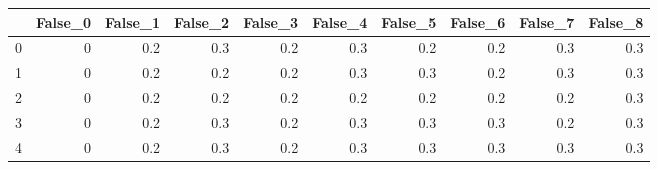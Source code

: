 \begin{tabular}{lrrrrrrrrr}
\toprule
{} &  False\_0 &  False\_1 &  False\_2 &  False\_3 &  False\_4 &  False\_5 &  False\_6 &  False\_7 &  False\_8 \\ \hline
\midrule
0 &        0 &      0.2 &      0.3 &      0.2 &      0.3 &      0.2 &      0.2 &      0.3 &      0.3 \\ \hline
1 &        0 &      0.2 &      0.2 &      0.2 &      0.3 &      0.3 &      0.2 &      0.3 &      0.3 \\ \hline
2 &        0 &      0.2 &      0.2 &      0.2 &      0.2 &      0.2 &      0.2 &      0.2 &      0.3 \\ \hline
3 &        0 &      0.2 &      0.3 &      0.2 &      0.3 &      0.3 &      0.3 &      0.2 &      0.3 \\ \hline
4 &        0 &      0.2 &      0.3 &      0.2 &      0.3 &      0.3 &      0.3 &      0.3 &      0.3 \\ \hline
\bottomrule
\end{tabular}
